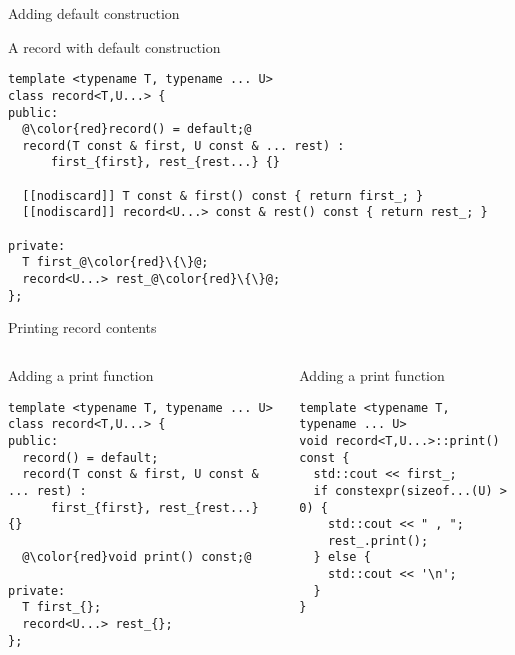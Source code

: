 \begin{frame}[t,fragile]{Adding default construction}
\begin{block}{A record with default construction}
\begin{lstlisting}[escapechar=@]
template <typename T, typename ... U>
class record<T,U...> {
public:
  @\color{red}record() = default;@
  record(T const & first, U const & ... rest) :
      first_{first}, rest_{rest...} {}

  [[nodiscard]] T const & first() const { return first_; }
  [[nodiscard]] record<U...> const & rest() const { return rest_; }

private:
  T first_@\color{red}\{\}@;
  record<U...> rest_@\color{red}\{\}@;
};
\end{lstlisting}
\end{block}
\end{frame}

\begin{frame}[t,fragile]{Printing record contents}

\begin{columns}[T]

\begin{block}{Adding a print function}
\begin{lstlisting}[escapechar=@]
template <typename T, typename ... U>
class record<T,U...> {
public:
  record() = default;
  record(T const & first, U const & ... rest) :
      first_{first}, rest_{rest...} {}

  @\color{red}void print() const;@

private:
  T first_{};
  record<U...> rest_{};
};
\end{lstlisting}
\end{block}

\pause
{}
\begin{block}{Adding a print function}
\begin{lstlisting}
template <typename T, typename ... U>
void record<T,U...>::print() const {
  std::cout << first_;
  if constexpr(sizeof...(U) > 0) {
    std::cout << " , ";
    rest_.print();
  } else {
    std::cout << '\n';
  }
}
\end{lstlisting}
\end{block}

\end{columns}
\end{frame}

